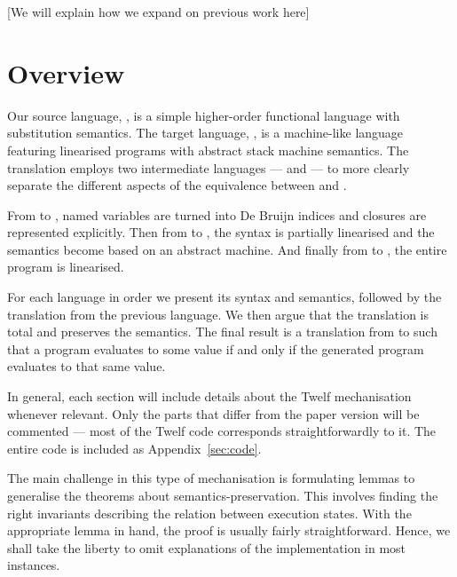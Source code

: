 [We will explain how we expand on previous work here]



\section{Overview}

Our source language, \hlang, is a simple higher-order functional language with substitution semantics.
The target language, \mlang, is a machine-like language featuring linearised programs with abstract stack machine semantics.
The translation employs two intermediate languages --- \blang and \slang --- to more clearly separate the different aspects of the equivalence between \hlang and \mlang.

From \hlang to \blang, named variables are turned into De Bruijn indices and closures are represented explicitly.
Then from \blang to \slang, the syntax is partially linearised and the semantics become based on an abstract machine.
And finally from \slang to \mlang, the entire program is linearised.

For each language in order we present its syntax and semantics, followed by the translation from the previous language.
We then argue that the translation is total and preserves the semantics.
The final result is a translation from \hlang to \mlang such that a \hlang program evaluates to some value if and only if the generated \mlang program evaluates to that same value.

In general, each section will include details about the Twelf mechanisation whenever relevant.
Only the parts that differ from the paper version will be commented --- most of the Twelf code corresponds straightforwardly to it.
The entire code is included as Appendix~\ref{sec:code}.

The main challenge in this type of mechanisation is formulating lemmas to generalise the theorems about semantics-preservation.
This involves finding the right invariants describing the relation between execution states.
With the appropriate lemma in hand, the proof is usually fairly straightforward.
Hence, we shall take the liberty to omit explanations of the implementation in most instances.
